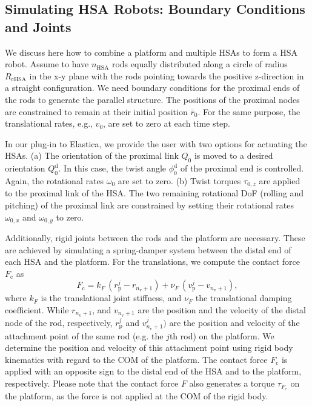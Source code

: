 \subsection{Simulating HSA Robots: Boundary Conditions and Joints}\label{sub:hsamodel:hsa_robot_simulation:hsa_robots}
%
We discuss here how to combine a platform and multiple \glspl{HSA} to form a \gls{HSA} robot.  Assume to have $n_\mathrm{HSA}$ rods equally distributed along a circle of radius $R_\mathrm{cHSA}$ in the x-y plane with the rods pointing towards the positive z-direction in a straight configuration.
%
We need boundary conditions for the proximal ends of the rods to generate the parallel structure. The positions of the proximal nodes are constrained to remain at their initial position $\bar{r}_{0}$.
For the same purpose, the translational rates, e.g., $v_0$, are set to zero at each time step. 

In our plug-in to Elastica, we provide the user with two options for actuating the \glspl{HSA}. (a) The orientation of the proximal link $Q_{0}$ is moved to a desired orientation $Q_{0}^\mathrm{d}$. In this case, the twist angle $\phi_0^\mathrm{d}$ of the proximal end is controlled. Again, the rotational rates $\omega_0$ are set to zero. 
(b) Twist torques $\tau_{0,z}$ are applied to the proximal link of the \gls{HSA}. The two remaining rotational DoF (rolling and pitching) of the proximal link are constrained by setting their rotational rates $\omega_{0,x}$ and $\omega_{0,y}$ to zero.

Additionally, rigid joints between the rods and the platform are necessary. These are achieved by simulating a spring-damper system between the distal end of each \gls{HSA} and the platform. For the translations, we compute the contact force $F_\mathrm{c}$ as 
\begin{equation}
    F_\mathrm{c} = k_F \, (r_\mathrm{p}^j - r_{n_\mathrm{v}+1}) + \nu_F \, (v_\mathrm{p}^j - v_{n_\mathrm{v}+1}),
\end{equation}
where $k_F$ is the translational joint stiffness, and $\nu_F$ the translational damping coefficient. While $r_{n_\mathrm{v}+1}$, and $v_{n_\mathrm{v}+1}$ are the position and the velocity of the distal node of the rod, respectively, $r_\mathrm{p}^j$ and $v_{n_\mathrm{v}+1}^j)$ are the position and velocity of the attachment point of the same rod (e.g. the $j$th rod) on the platform. We determine the position and velocity of this attachment point using rigid body kinematics with regard to the \gls{COM} of the platform. The contact force $F_\mathrm{c}$ is applied with an opposite sign to the distal end of the \gls{HSA} and to the platform, respectively. Please note that the contact force $F$ also generates a torque $\tau_{F_\mathrm{c}}$ on the platform, as the force is not applied at the \gls{COM} of the rigid body.

